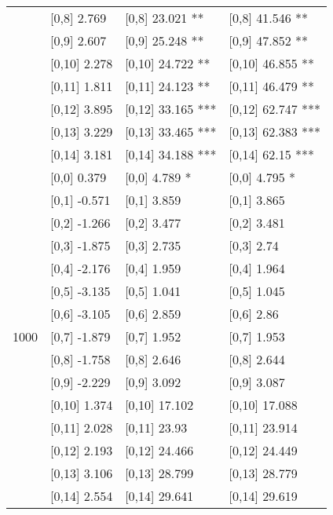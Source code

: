 \begin{table}
\begin{tabular}[t]{llll}
 & {}[0,8] 2.769 & {}[0,8] 23.021 ** & {}[0,8] 41.546 **\\
 & {}[0,9] 2.607 & {}[0,9] 25.248 ** & {}[0,9] 47.852 **\\
\addlinespace
 & {}[0,10] 2.278 & {}[0,10] 24.722 ** & {}[0,10] 46.855 **\\
 & {}[0,11] 1.811 & {}[0,11] 24.123 ** & {}[0,11] 46.479 **\\
 & {}[0,12] 3.895 & {}[0,12] 33.165 *** & {}[0,12] 62.747 ***\\
 & {}[0,13] 3.229 & {}[0,13] 33.465 *** & {}[0,13] 62.383 ***\\
 & {}[0,14] 3.181 & {}[0,14] 34.188 *** & {}[0,14] 62.15 ***\\
\addlinespace
 & {}[0,0] 0.379 & {}[0,0] 4.789 * & {}[0,0] 4.795 *\\
 & {}[0,1] -0.571 & {}[0,1] 3.859 & {}[0,1] 3.865\\
 & {}[0,2] -1.266 & {}[0,2] 3.477 & {}[0,2] 3.481\\
 & {}[0,3] -1.875 & {}[0,3] 2.735 & {}[0,3] 2.74\\
 & {}[0,4] -2.176 & {}[0,4] 1.959 & {}[0,4] 1.964\\
\addlinespace
 & {}[0,5] -3.135 & {}[0,5] 1.041 & {}[0,5] 1.045\\
 & {}[0,6] -3.105 & {}[0,6] 2.859 & {}[0,6] 2.86\\
1000 & {}[0,7] -1.879 & {}[0,7] 1.952 & {}[0,7] 1.953\\
 & {}[0,8] -1.758 & {}[0,8] 2.646 & {}[0,8] 2.644\\
 & {}[0,9] -2.229 & {}[0,9] 3.092 & {}[0,9] 3.087\\
\addlinespace
 & {}[0,10] 1.374 & {}[0,10] 17.102 & {}[0,10] 17.088\\
 & {}[0,11] 2.028 & {}[0,11] 23.93 & {}[0,11] 23.914\\
 & {}[0,12] 2.193 & {}[0,12] 24.466 & {}[0,12] 24.449\\
 & {}[0,13] 3.106 & {}[0,13] 28.799 & {}[0,13] 28.779\\
 & {}[0,14] 2.554 & {}[0,14] 29.641 & {}[0,14] 29.619\\
\bottomrule
\end{tabular}
\end{table}
